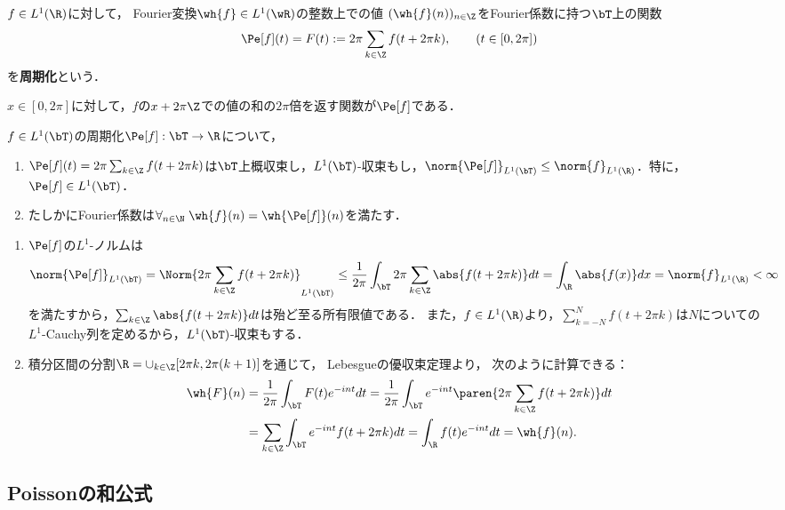 \documentclass[uplatex,dvipdfmx]{jsreport}
\begin{document}
\begin{definition}[periodization]
    $f\in L^1(\R)$に対して，
    Fourier変換$\wh{f}\in L^1(\wR)$の整数上での値
    $(\wh{f}(n))_{n\in\Z}$をFourier係数に持つ$\bT$上の関数
    \[\Pe[f](t)=F(t):=2\pi\sum_{k\in\Z}f(t+2\pi k),\qquad(t\in[0,2\pi])\]
    を\textbf{周期化}という．
\end{definition}
\begin{remarks}
    $x\in[0,2\pi]$に対して，$f$の$x+2\pi\Z$での値の和の$2\pi$倍を返す関数が$\Pe[f]$である．
\end{remarks}

\begin{lemma}[定義の成功]
    $f\in L^1(\bT)$の周期化$\Pe[f]:\bT\to\R$について，
    \begin{enumerate}
        \item $\Pe[f](t)=2\pi\sum_{k\in\Z}f(t+2\pi k)$は$\bT$上概収束し，$L^1(\bT)$-収束もし，$\norm{\Pe[f]}_{L^1(\bT)}\le\norm{f}_{L^1(\R)}$．特に，$\Pe[f]\in L^1(\bT)$．
        \item たしかにFourier係数は$\forall_{n\in\N}\;\wh{f}(n)=\wh{\Pe[f]}(n)$を満たす．
    \end{enumerate}
\end{lemma}
\begin{Proof}\mbox{}
    \begin{enumerate}
        \item $\Pe[f]$の$L^1$-ノルムは
        \[\norm{\Pe[f]}_{L^1(\bT)}=\Norm{2\pi\sum_{k\in\Z}f(t+2\pi k)}_{L^1(\bT)}\le\frac{1}{2\pi}\int_\bT2\pi\sum_{k\in\Z}\abs{f(t+2\pi k)}dt=\int_\R\abs{f(x)}dx=\norm{f}_{L^1(\R)}<\infty\]
        を満たすから，$\sum_{k\in\Z}\abs{f(t+2\pi k)}dt$は殆ど至る所有限値である．
        また，$f\in L^1(\R)$より，$\sum_{k=-N}^Nf(t+2\pi k)$は$N$についての$L^1$-Cauchy列を定めるから，$L^1(\bT)$-収束もする．
        \item 積分区間の分割$\R=\cup_{k\in\Z}[2\pi k,2\pi (k+1)]$を通じて，
        Lebesgueの優収束定理より，
        次のように計算できる：
        \begin{align*}
            \wh{F}(n)&=\frac{1}{2\pi}\int_\bT F(t)e^{-int}dt=\frac{1}{2\pi}\int_\bT e^{-int}\paren{2\pi\sum_{k\in\Z}f(t+2\pi k)}dt\\
            &=\sum_{k\in\Z}\int_\bT e^{-int}f(t+2\pi k)dt=\int_\R f(t)e^{-int}dt=\wh{f}(n).
        \end{align*}
    \end{enumerate}
\end{Proof}

\subsection{Poissonの和公式}
\end{document}
